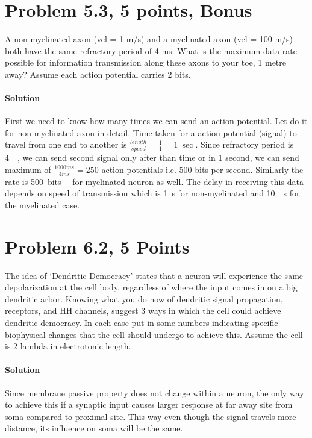 \documentclass[a4paper,10pt]{article}
\begin{document}
\section*{Problem 5.3, 5 points, Bonus}
A non-myelinated axon (vel = 1 m/s) and a myelinated axon (vel = 100 m/s) both
have the same refractory period of 4 ms. What is the maximum data rate possible
for information transmission along these axons to your toe, 1 metre away? Assume
each action potential carries 2 bits.
    
\paragraph{Solution}

First we need to know how many times we can send an action potential. Let do it
for non-myelinated axon in detail. Time taken for a action potential (signal) to
travel from one end to another is 
$\frac{length}{speed} = \frac{1}{1} = \SI{1}{\sec}$. Since refractory period is
\SI{4}{\milli \sec}, we can send second signal only after than time or in 1
second, we can send maximum of $\frac{1000 ms}{4 ms} = 250$ action potentials
i.e. 500 bits per second. Similarly the rate is \SI{500}{bits \per \sec} for
myelinated neuron as well. The delay in receiving this data depends on speed of
transmission which is \SI{1}{\second} for non-myelinated and \SI{10}{\milli
\second} for the myelinated case.

\section*{Problem 6.2, 5 Points}

The idea of ‘Dendritic Democracy’ states that a neuron will experience the same
depolarization at the cell body, regardless of where the input comes in on a big
dendritic arbor. Knowing what you do now of dendritic signal propagation,
receptors, and HH channels, suggest 3 ways in which the cell could achieve
dendritic democracy. In each case put in some numbers indicating specific
biophysical changes that the cell should undergo to achieve this. Assume the
cell is 2 lambda in electrotonic length.

\paragraph{Solution} Since membrane passive property does not change within a
neuron, the only way to achieve this if a synaptic input causes larger response
at far away site from soma compared to proximal site. This way even though the
signal travels more distance, its influence on soma will be the same.
\end{document}
